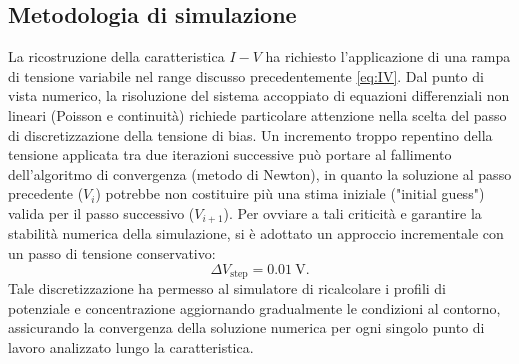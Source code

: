 \documentclass[a4paper,11pt]{report}
\begin{document}
\subsection{Metodologia di simulazione}
La ricostruzione della caratteristica $I-V$ ha richiesto l'applicazione di una rampa di tensione variabile nel range discusso precedentemente \eqref{eq:IV}.
Dal punto di vista numerico, la risoluzione del sistema accoppiato di equazioni differenziali non lineari (Poisson e continuità) richiede particolare attenzione nella scelta del passo di discretizzazione della tensione di bias. Un incremento troppo repentino della tensione applicata tra due iterazioni successive può portare al fallimento dell'algoritmo di convergenza (metodo di Newton), in quanto la soluzione al passo precedente ($V_i$) potrebbe non costituire più una stima iniziale ("initial guess") valida per il passo successivo ($V_{i+1}$).
Per ovviare a tali criticità e garantire la stabilità numerica della simulazione, si è adottato un approccio incrementale con un passo di tensione conservativo:
\begin{equation}
    \Delta V_{\text{step}} = \SI{0.01}{\volt}.
\end{equation}
Tale discretizzazione ha permesso al simulatore di ricalcolare i profili di potenziale e concentrazione aggiornando gradualmente le condizioni al contorno, assicurando la convergenza della soluzione numerica per ogni singolo punto di lavoro analizzato lungo la caratteristica.
\end{document}
